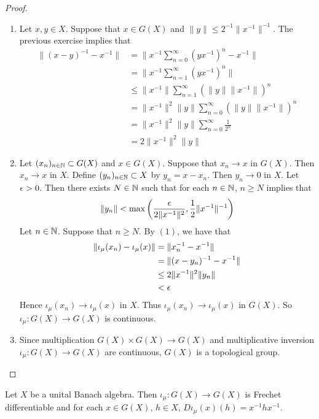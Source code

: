 \documentclass{book}
\begin{document}
\begin{proof}\
	\begin{enumerate}
		\item Let $x,y \in X$. Suppose that $x \in G(X)$ and $\|y\| \leq 2^{-1} \|x^{-1}\|^{-1}$. The previous exercise implies that 
		\begin{align*}
			\|(x - y)^{-1} - x^{-1}\|
			& = \bigg \| x^{-1}\sum_{n=0}^{\infty}(yx^{-1})^n  - x^{-1}\bigg\| \\
			& = \bigg \| x^{-1}\sum_{n=1}^{\infty}(yx^{-1})^n  \bigg\| \\
			& \leq \|x^{-1}\| \sum_{n=1}^{\infty} (\|y\|\|x^{-1}\|)^n \\
			& = \|x^{-1}\|^{2} \|y\| \sum_{n=0}^{\infty} (\|y\|\|x^{-1}\|)^n \\ 
			& = \|x^{-1}\|^{2} \|y\| \sum_{n=0}^{\infty} \frac{1}{2^n} \\
			& = 2 \|x^{-1}\|^{2} \|y\| 
		\end{align*}
		\item Let $(x_n)_{n \in \mathbb{N}} \subset G(X)$ and $x \in G(X)$. Suppose that $x_n \rightarrow x$ in $G(X)$. Then $x_n \rightarrow x$ in $X$. Define $(y_n)_{n \in \mathbb{N}} \subset X$ by $y_n = x - x_n$. Then $y_n \rightarrow 0$ in $X$. Let $\epsilon > 0$. Then there exists $N \in \mathbb{N}$ such that for each $n \in \mathbb{N}$, $n \geq N$ implies that 
		$$\|y_n \| < \max \bigg(\frac{\epsilon}{2\|x^{-1}\|^2}, \frac{1}{2} \|x^{-1}\|^{-1} \bigg)$$
		Let $n \in \mathbb{N}$. Suppose that $n \geq N$. By $(1)$, we have that 
		\begin{align*}
			\|\iota_{\mu}(x_n) - \iota_{\mu}(x)\|
			& = \|x_n^{-1} - x^{-1}\| \\
			& = \|(x - y_n)^{-1} - x^{-1}\| \\
			& \leq 2\|x^{-1}\|^2\|y_n\| \\
			& < \epsilon 
		\end{align*} 
		Hence $\iota_{\mu}(x_n) \rightarrow \iota_{\mu}(x)$ in $X$. Thus $\iota_{\mu}(x_n) \rightarrow \iota_{\mu}(x)$ in $G(X)$. So $\iota_{\mu}: G(X) \rightarrow G(X)$ is continuous. 
		\item Since multiplication $G(X) \times G(X) \rightarrow G(X)$ and multiplicative inversion $\iota_{\mu}: G(X) \rightarrow G(X)$ are continuous, $G(X)$ is a topological group. 
	\end{enumerate}
\end{proof}

\begin{ex}
	Let $X$ be a unital Banach algebra. Then $\iota_{\mu}: G(X) \rightarrow G(X)$ is Frechet differentiable and for each $x \in G(X)$, $h \in X$,  $D \iota_{\mu}(x)(h) = x^{-1}hx^{-1}$.
\end{ex}
\end{document}
